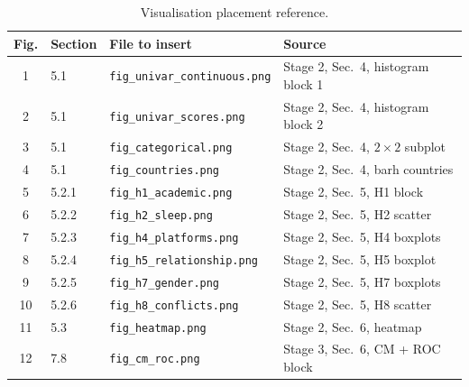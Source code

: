 \documentclass[10pt]{article}
\begin{document}
\begin{table}[H]
\centering
\caption{Visualisation placement reference.}
\label{tab:figguide}
\small
\begin{tabularx}{\linewidth}{@{} c l l X @{}}
\toprule
\textbf{Fig.} & \textbf{Section} & \textbf{File to insert}
  & \textbf{Source} \\
\midrule
1 & 5.1 & \texttt{fig\_univar\_continuous.png}
  & Stage 2, Sec.\ 4, histogram block 1 \\
2 & 5.1 & \texttt{fig\_univar\_scores.png}
  & Stage 2, Sec.\ 4, histogram block 2 \\
3 & 5.1 & \texttt{fig\_categorical.png}
  & Stage 2, Sec.\ 4, $2\times2$ subplot \\
4 & 5.1 & \texttt{fig\_countries.png}
  & Stage 2, Sec.\ 4, barh countries \\
5 & 5.2.1 & \texttt{fig\_h1\_academic.png}
  & Stage 2, Sec.\ 5, H1 block \\
6 & 5.2.2 & \texttt{fig\_h2\_sleep.png}
  & Stage 2, Sec.\ 5, H2 scatter \\
7 & 5.2.3 & \texttt{fig\_h4\_platforms.png}
  & Stage 2, Sec.\ 5, H4 boxplots \\
8 & 5.2.4 & \texttt{fig\_h5\_relationship.png}
  & Stage 2, Sec.\ 5, H5 boxplot \\
9 & 5.2.5 & \texttt{fig\_h7\_gender.png}
  & Stage 2, Sec.\ 5, H7 boxplots \\
10 & 5.2.6 & \texttt{fig\_h8\_conflicts.png}
  & Stage 2, Sec.\ 5, H8 scatter \\
11 & 5.3 & \texttt{fig\_heatmap.png}
  & Stage 2, Sec.\ 6, heatmap \\
12 & 7.8 & \texttt{fig\_cm\_roc.png}
  & Stage 3, Sec.\ 6, CM + ROC block \\
\bottomrule
\end{tabularx}
\end{table}
\end{document}
